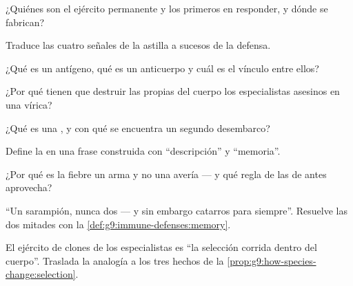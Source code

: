 \begin{exercise}[$\star$]\label{exo:g9:immune-defenses:1}
¿Quiénes son el ejército permanente y los primeros en responder, y
dónde se fabrican?
\end{exercise}

\begin{exercise}[$\star$]\label{exo:g9:immune-defenses:2}
Traduce las cuatro señales de la astilla a sucesos de la defensa.
\end{exercise}

\begin{exercise}[$\star$]\label{exo:g9:immune-defenses:3}
¿Qué es un antígeno, qué es un anticuerpo y cuál es el vínculo entre
ellos?
\end{exercise}

\begin{exercise}[$\star$]\label{exo:g9:immune-defenses:4}
¿Por qué tienen que destruir las propias  del cuerpo los
especialistas asesinos en una  vírica?
\end{exercise}

\begin{exercise}[$\star$]\label{exo:g9:immune-defenses:5}
¿Qué es una , y con qué se encuentra un segundo
desembarco?
\end{exercise}

\begin{exercise}[$\star$]\label{exo:g9:immune-defenses:6}
Define la  en una frase construida con ``descripción'' y
``memoria''.
\end{exercise}

\begin{exercise}[$\star\star$]\label{exo:g9:immune-defenses:7}
¿Por qué es la fiebre un arma y no una avería --- y qué regla de las
 de antes aprovecha?
\end{exercise}

\begin{exercise}[$\star\star$]\label{exo:g9:immune-defenses:8}
``Un sarampión, nunca dos --- y sin embargo catarros para siempre''.
Resuelve las dos mitades con la
\cref{def:g9:immune-defenses:memory}.
\end{exercise}

\begin{exercise}[$\star\star$]\label{exo:g9:immune-defenses:9}
El ejército de clones de los especialistas es ``la selección corrida
dentro del cuerpo''. Traslada la analogía a los tres hechos de la
\cref{prop:g9:how-species-change:selection}.
\end{exercise}

